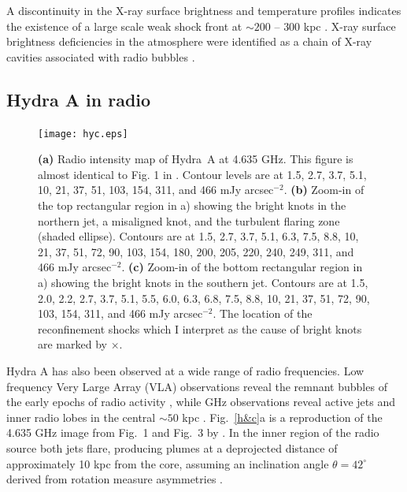
A discontinuity in the X-ray surface brightness and temperature profiles indicates the existence of a large scale weak shock front at $\sim200$ -- $300$ kpc \citep{nulsen05}. X-ray surface brightness deficiencies in the atmosphere were identified as a chain of X-ray cavities associated with radio bubbles \citep{wise07}.

\subsection{Hydra A in radio}
\begin{figure}
\centering
\texttt{[image: hyc.eps]}
\caption{ \textbf{(a)} Radio intensity map of Hydra~A at 4.635 GHz. This figure is almost identical to Fig. 1 in \citet{taylor90}. Contour levels are at 1.5, 2.7, 3.7, 5.1, 10, 21, 37, 51, 103, 154, 311, and 466 mJy arcsec$^{-2}$. \textbf{(b)} Zoom-in of the top rectangular region in a) showing the bright knots in the northern jet, a misaligned knot, and the turbulent flaring zone (shaded ellipse). Contours are at 1.5, 2.7, 3.7, 5.1, 6.3, 7.5, 8.8, 10, 21, 37, 51, 72, 90, 103, 154, 180, 200, 205, 220, 240, 249, 311, and 466 mJy arcsec$^{-2}$. \textbf{(c)} Zoom-in of the bottom rectangular region in a) showing the bright knots in the southern jet. Contours are at 1.5, 2.0, 2.2, 2.7, 3.7, 5.1, 5.5, 6.0, 6.3, 6.8, 7.5, 8.8, 10, 21, 37, 51,  72, 90, 103, 154, 311, and 466 mJy arcsec$^{-2}$. The location of the reconfinement shocks which I interpret as the cause of bright knots are marked by $\times$.}
\label{hyc}
\end{figure}


Hydra A has also been observed at a wide range of radio frequencies. Low frequency Very Large Array (VLA) observations reveal the remnant bubbles of the early epochs of radio activity \citep{lane04}, while GHz observations reveal active jets and inner radio lobes in the central $\sim50$ kpc \citep{taylor90}. Fig.~\ref{h&c}a is a reproduction of the 4.635 GHz image from Fig.~1 and Fig.~3 by \citet{taylor90}. In the inner region of the radio source both jets flare, producing plumes at a deprojected distance of approximately 10 kpc from the core, assuming an inclination angle $\theta=42^\circ$ derived from rotation measure asymmetries \citep{taylor90,taylor93}.


